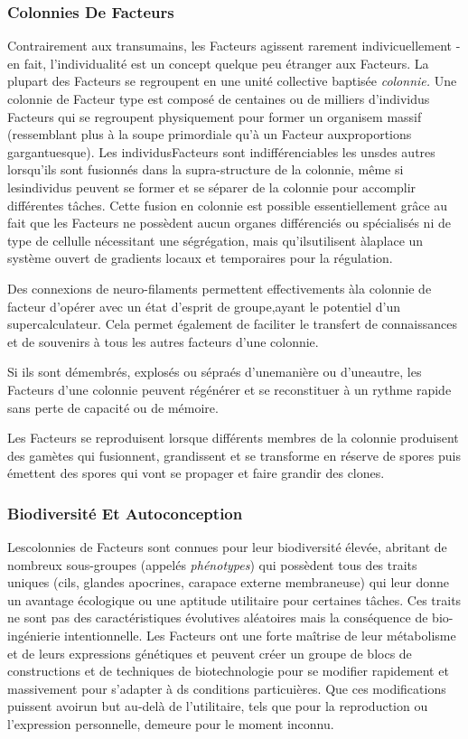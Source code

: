 \subsubsection{Colonnies De Facteurs} 

Contrairement aux transumains, les Facteurs agissent rarement indivicuellement - en fait, l'individualité est un concept quelque peu étranger aux Facteurs. La plupart des Facteurs se regroupent en une unité collective baptisée \textit{colonnie.} Une colonnie de Facteur type est composé de centaines ou de milliers d'individus Facteurs qui se regroupent physiquement pour former un organisem massif (ressemblant plus à la soupe primordiale qu'à un Facteur auxproportions gargantuesque). Les individusFacteurs sont indifférenciables les unsdes autres lorsqu'ils sont fusionnés dans la supra-structure de la colonnie, même si lesindividus peuvent se former et se séparer de la colonnie pour accomplir différentes tâches. Cette fusion en colonnie est possible essentiellement grâce au fait que les Facteurs ne possèdent aucun organes différenciés ou spécialisés ni de type de cellulle nécessitant une ségrégation, mais qu'ilsutilisent àlaplace un système ouvert de gradients locaux et temporaires pour la régulation. 

Des connexions de neuro-filaments permettent effectivements àla colonnie de facteur d'opérer avec un état d'esprit de groupe,ayant le potentiel d'un supercalculateur. Cela permet également de faciliter le transfert de connaissances et de souvenirs à tous les autres facteurs d'une colonnie. 

Si ils sont démembrés, explosés ou sépraés d'unemanière ou d'uneautre, les Facteurs d'une colonnie peuvent régénérer et se reconstituer à un rythme rapide sans perte de capacité ou de mémoire. 

Les Facteurs se reproduisent lorsque différents membres de la colonnie produisent des gamètes qui fusionnent, grandissent et se transforme en réserve de spores puis émettent des spores qui vont se propager et faire grandir des clones. 

\subsubsection{Biodiversité Et Autoconception} 

Lescolonnies de Facteurs sont connues pour leur biodiversité élevée, abritant de nombreux sous-groupes (appelés \textit{phénotypes}) qui possèdent tous des traits uniques (cils, glandes apocrines, carapace externe membraneuse) qui leur donne un avantage écologique ou une aptitude utilitaire pour certaines tâches. Ces traits ne sont pas des caractéristiques évolutives aléatoires mais la conséquence de bio-ingénierie intentionnelle. Les Facteurs ont une forte maîtrise de leur métabolisme et de leurs expressions génétiques et peuvent créer un groupe de blocs de constructions et de techniques de biotechnologie pour se modifier rapidement et massivement pour s'adapter à ds conditions particuières. Que ces modifications puissent avoirun but au-delà de l'utilitaire, tels que pour la reproduction ou l'expression personnelle, demeure pour le moment inconnu. 

